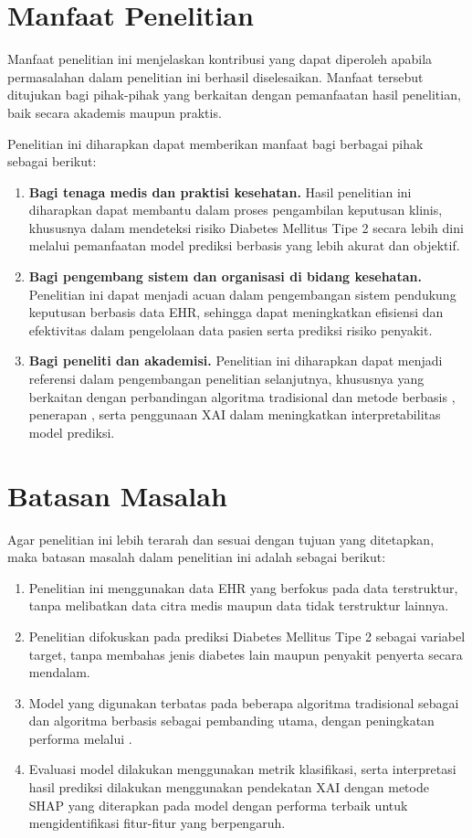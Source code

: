 \section{Manfaat Penelitian}
Manfaat penelitian ini menjelaskan kontribusi yang dapat diperoleh apabila permasalahan dalam penelitian ini berhasil diselesaikan. Manfaat tersebut ditujukan bagi pihak-pihak yang berkaitan dengan pemanfaatan hasil penelitian, baik secara akademis maupun praktis.

Penelitian ini diharapkan dapat memberikan manfaat bagi berbagai pihak sebagai berikut:
\begin{enumerate}
\item \textbf{Bagi tenaga medis dan praktisi kesehatan.} Hasil penelitian ini diharapkan dapat membantu dalam proses pengambilan keputusan klinis, khususnya dalam mendeteksi risiko Diabetes Mellitus Tipe 2 secara lebih dini melalui pemanfaatan model prediksi berbasis  yang lebih akurat dan objektif.
\item \textbf{Bagi pengembang sistem dan organisasi di bidang kesehatan.} Penelitian ini dapat menjadi acuan dalam pengembangan sistem pendukung keputusan berbasis data EHR, sehingga dapat meningkatkan efisiensi dan efektivitas dalam pengelolaan data pasien serta prediksi risiko penyakit.
\item \textbf{Bagi peneliti dan akademisi.} Penelitian ini diharapkan dapat menjadi referensi dalam pengembangan penelitian selanjutnya, khususnya yang berkaitan dengan perbandingan algoritma  tradisional dan metode berbasis , penerapan , serta penggunaan XAI dalam meningkatkan interpretabilitas model prediksi.
\end{enumerate}

\section{Batasan Masalah}
Agar penelitian ini lebih terarah dan sesuai dengan tujuan yang ditetapkan, maka batasan masalah dalam penelitian ini adalah sebagai berikut:
\begin{enumerate}
\item Penelitian ini menggunakan data EHR yang berfokus pada data terstruktur, tanpa melibatkan data citra medis maupun data tidak terstruktur lainnya.
\item Penelitian difokuskan pada prediksi Diabetes Mellitus Tipe 2 sebagai variabel target, tanpa membahas jenis diabetes lain maupun penyakit penyerta secara mendalam.
\item Model yang digunakan terbatas pada beberapa algoritma  tradisional sebagai  dan algoritma berbasis  sebagai pembanding utama, dengan peningkatan performa melalui .
\item Evaluasi model dilakukan menggunakan metrik klasifikasi, serta interpretasi hasil prediksi dilakukan menggunakan pendekatan XAI dengan metode SHAP yang diterapkan pada model dengan performa terbaik untuk mengidentifikasi fitur-fitur yang berpengaruh.
\end{enumerate}

